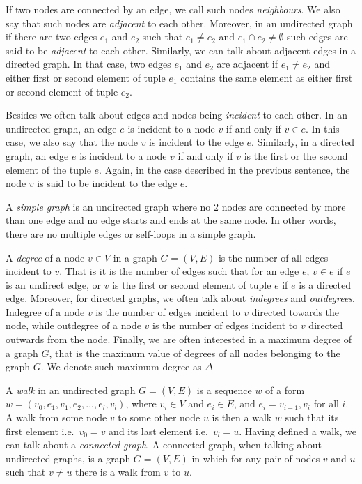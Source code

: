 If two nodes are connected by an edge, we call such nodes \emph{neighbours}. We
also say that such nodes are \emph{adjacent} to each other. Moreover, in an undirected graph
if there are two edges $e_1$ and $e_2$ such that $e_1 \neq e_2$ and $e_1 \cap e_2 \neq \emptyset$
such edges are said to be \emph{adjacent} to each other. Similarly, we can talk about adjacent 
edges in a directed graph. In that case, two edges $e_1$ and $e_2$ are adjacent if
$e_1 \neq e_2$ and either first or second element of tuple $e_1$ contains the same
element as either first or second element of tuple $e_2$.

Besides we often talk about edges and nodes being \emph{incident} to each other.
In an undirected graph, an edge $e$ is incident to a node $v$ if and only if $v \in e$. In this
case, we also say that the node $v$ is incident to the edge $e$. Similarly, in a
directed graph, an edge $e$ is incident to a node $v$ if and only if $v$ is the
first or the second element of the tuple $e$. Again, in the case described in the
previous sentence, the node $v$ is said to be incident to the edge $e$.

A \emph{simple graph} is an undirected graph where no 2 nodes are connected by more
than one edge and no edge starts and ends at the same node. In other words, there are
no multiple edges or self-loops in a simple graph.

A \emph{degree} of a node $v \in V$ in a graph $G = (V, E)$ is the number of all
edges incident to $v$. That is it is the number of edges such that for an edge
$e$, $v \in e$ if $e$ is an undirect edge, or $v$ is the first or second element of
tuple $e$ if $e$ is a directed edge. Moreover, for directed graphs, we often talk
about \emph{indegrees} and \emph{outdegrees}. Indegree of a node $v$ is the number
of edges incident to $v$ directed towards the node, while outdegree of a node $v$ is the 
number of edges incident to $v$ directed outwards from the node. Finally, we are 
often interested in a maximum degree of a graph $G$, that is the maximum value of
degrees of all nodes belonging to the graph $G$. We denote such maximum degree as
$\Delta$

A \emph{walk} in an undirected graph $G = (V, E)$ is a sequence $w$ of a form
$w = (v_0, e_1, v_1, e_2, ..., e_l, v_l)$,
where $v_i \in V$ and $e_i \in E$, and $e_i = {v_{i-1}, v_i}$ for all $i$. A walk from some
node $v$ to some other node $u$ is then a walk $w$ such that its first element i.e.\ $v_0 = v$
and its last element i.e.\ $v_l = u$. Having defined a walk, we can talk about a \emph{
connected graph}. A connected graph, when talking about undirected
graphs, is a graph $G = (V, E)$ in which for any pair of nodes $v$ and $u$ such that
$v \neq u$ there is a walk from $v$ to $u$.

